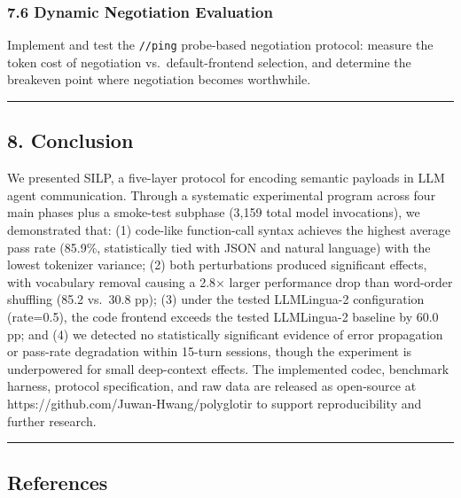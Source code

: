 \subsubsection{7.6 Dynamic Negotiation Evaluation}\label{dynamic-negotiation-evaluation}



Implement and test the \texttt{//ping} probe-based negotiation protocol: measure the token cost of negotiation vs.~default-frontend selection, and determine the breakeven point where negotiation becomes worthwhile.



\begin{center}\rule{0.5\linewidth}{0.5pt}\end{center}



\subsection{8. Conclusion}\label{conclusion}



We presented SILP, a five-layer protocol for encoding semantic payloads in LLM agent communication. Through a systematic experimental program across four main phases plus a smoke-test subphase (3,159 total model invocations), we demonstrated that: (1) code-like function-call syntax achieves the highest average pass rate (85.9\%, statistically tied with JSON and natural language) with the lowest tokenizer variance; (2) both perturbations produced significant effects, with vocabulary removal causing a 2.8× larger performance drop than word-order shuffling (85.2 vs.~30.8 pp); (3) under the tested LLMLingua-2 configuration (rate=0.5), the code frontend exceeds the tested LLMLingua-2 baseline by 60.0 pp; and (4) we detected no statistically significant evidence of error propagation or pass-rate degradation within 15-turn sessions, though the experiment is underpowered for small deep-context effects. The implemented codec, benchmark harness, protocol specification, and raw data are released as open-source at https://github.com/Juwan-Hwang/polyglotir to support reproducibility and further research.



\begin{center}\rule{0.5\linewidth}{0.5pt}\end{center}



\subsection{References}\label{references}



